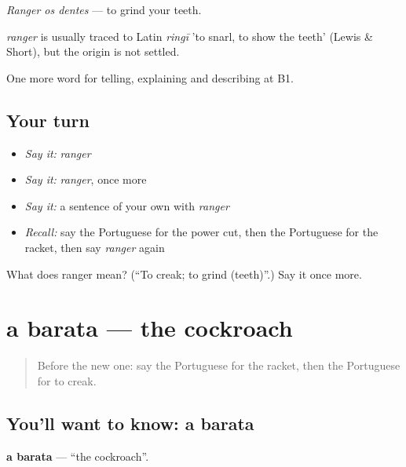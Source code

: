 \emph{Ranger os dentes} — to grind your teeth.

\begin{cousinweb}
\emph{ranger} is usually traced to Latin \emph{ringī} 'to snarl, to show the teeth' (Lewis \& Short), but the origin is not settled.
\end{cousinweb}

\begin{grammarlens}[title={What you've built}]
One more word for telling, explaining and describing at B1.
\end{grammarlens}

\subsection*{Your turn}
\begin{itemize}
\raggedright
  \item \emph{Say it:} \emph{ranger}
  \item \emph{Say it:} \emph{ranger}, once more
  \item \emph{Say it:} a sentence of your own with \emph{ranger}
  \item \emph{Recall:} say the Portuguese for the power cut, then the Portuguese for the racket, then say \emph{ranger} again
\end{itemize}

\begin{tcolorbox}[breakable,colback=teal!4,colframe=teal!35!black,title={Before you move on}]
What does ranger mean? (\textquotedblleft{}To creak; to grind (teeth)\textquotedblright{}.) Say it once more.
\end{tcolorbox}
\section[a barata]{a barata — the cockroach}

\label{lesson:PT-C433-barata}



\begin{quote}
Before the new one: say the Portuguese for the racket, then the Portuguese for to creak.
\end{quote}

\subsection*{You'll want to know: a barata}
\textbf{a barata} — \textquotedblleft{}the cockroach\textquotedblright{}.

